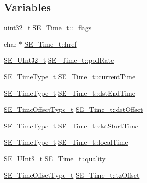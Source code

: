\subsection*{Variables}
\begin{DoxyCompactItemize}
\item 
uint32\+\_\+t \hyperlink{group__Time_ga77ececb939204e19a09422aab87ca739}{S\+E\+\_\+\+Time\+\_\+t\+::\+\_\+flags}
\item 
char $\ast$ \hyperlink{group__Time_ga550afbd989e7f4252cde4854ce409321}{S\+E\+\_\+\+Time\+\_\+t\+::href}
\item 
\hyperlink{group__UInt32_ga70bd4ecda3c0c85d20779d685a270cdb}{S\+E\+\_\+\+U\+Int32\+\_\+t} \hyperlink{group__Time_ga56ef9035d9d9bd59708c6e229c12ac1d}{S\+E\+\_\+\+Time\+\_\+t\+::poll\+Rate}
\item 
\hyperlink{group__TimeType_ga6fba87a5b57829b4ff3f0e7638156682}{S\+E\+\_\+\+Time\+Type\+\_\+t} \hyperlink{group__Time_ga5cf45c45c382652cb37ce1a82a5168c5}{S\+E\+\_\+\+Time\+\_\+t\+::current\+Time}
\item 
\hyperlink{group__TimeType_ga6fba87a5b57829b4ff3f0e7638156682}{S\+E\+\_\+\+Time\+Type\+\_\+t} \hyperlink{group__Time_ga37d25a3c96a9202c1cfe1ebba752dfde}{S\+E\+\_\+\+Time\+\_\+t\+::dst\+End\+Time}
\item 
\hyperlink{group__TimeOffsetType_ga3de71705a6723a1013cf383b705cbd8a}{S\+E\+\_\+\+Time\+Offset\+Type\+\_\+t} \hyperlink{group__Time_gad39cc4dd3b9a9c27fc6bebc96087e759}{S\+E\+\_\+\+Time\+\_\+t\+::dst\+Offset}
\item 
\hyperlink{group__TimeType_ga6fba87a5b57829b4ff3f0e7638156682}{S\+E\+\_\+\+Time\+Type\+\_\+t} \hyperlink{group__Time_gaf4060734856defac5df4e4ebc2a18690}{S\+E\+\_\+\+Time\+\_\+t\+::dst\+Start\+Time}
\item 
\hyperlink{group__TimeType_ga6fba87a5b57829b4ff3f0e7638156682}{S\+E\+\_\+\+Time\+Type\+\_\+t} \hyperlink{group__Time_ga5ef728cdc93212ad86dbfd9cddf7cfb3}{S\+E\+\_\+\+Time\+\_\+t\+::local\+Time}
\item 
\hyperlink{group__UInt8_gaf7c365a1acfe204e3a67c16ed44572f5}{S\+E\+\_\+\+U\+Int8\+\_\+t} \hyperlink{group__Time_gaffccaff3c359127d182761e91ab28867}{S\+E\+\_\+\+Time\+\_\+t\+::quality}
\item 
\hyperlink{group__TimeOffsetType_ga3de71705a6723a1013cf383b705cbd8a}{S\+E\+\_\+\+Time\+Offset\+Type\+\_\+t} \hyperlink{group__Time_ga3017647596cbc5718fc84d97f7738684}{S\+E\+\_\+\+Time\+\_\+t\+::tz\+Offset}
\end{DoxyCompactItemize}


